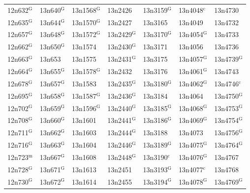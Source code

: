 \documentclass[12pt, oneside]{amsart}
\begin{document}
{\begin{longtable}{*{7}{>{\raggedright\arraybackslash}p{}}}
12n632$^{\mathrm{G}}$ & 13n640$^{\mathrm{G}}$ & 13n1568$^{\mathrm{G}}$ & 13n2426 & 13n3159$^{\mathrm{G}}$ & 13n4048$^{\mathrm{c}}$ & 13n4730 \\
12n635$^{\mathrm{G}}$ & 13n644$^{\mathrm{G}}$ & 13n1570$^{\mathrm{G}}$ & 13n2427 & 13n3165 & 13n4049 & 13n4732 \\
12n657$^{\mathrm{G}}$ & 13n648$^{\mathrm{G}}$ & 13n1572$^{\mathrm{G}}$ & 13n2429$^{\mathrm{G}}$ & 13n3170$^{\mathrm{G}}$ & 13n4054$^{\mathrm{G}}$ & 13n4733 \\
12n662$^{\mathrm{G}}$ & 13n650$^{\mathrm{G}}$ & 13n1574 & 13n2430$^{\mathrm{G}}$ & 13n3171 & 13n4056 & 13n4736 \\
12n663$^{\mathrm{G}}$ & 13n653 & 13n1575 & 13n2431$^{\mathrm{G}}$ & 13n3175 & 13n4057$^{\mathrm{G}}$ & 13n4739$^{\mathrm{G}}$ \\
12n664$^{\mathrm{G}}$ & 13n655$^{\mathrm{G}}$ & 13n1578$^{\mathrm{G}}$ & 13n2432 & 13n3176 & 13n4061$^{\mathrm{G}}$ & 13n4743 \\
12n678$^{\mathrm{G}}$ & 13n657$^{\mathrm{G}}$ & 13n1583 & 13n2435$^{\mathrm{G}}$ & 13n3180$^{\mathrm{G}}$ & 13n4062$^{\mathrm{G}}$ & 13n4746$^{\mathrm{c}}$ \\
12n695$^{\mathrm{G}}$ & 13n658$^{\mathrm{G}}$ & 13n1587$^{\mathrm{G}}$ & 13n2436$^{\mathrm{G}}$ & 13n3184 & 13n4064 & 13n4750$^{\mathrm{G}}$ \\
12n702$^{\mathrm{G}}$ & 13n659$^{\mathrm{G}}$ & 13n1596$^{\mathrm{G}}$ & 13n2440$^{\mathrm{G}}$ & 13n3185$^{\mathrm{G}}$ & 13n4068$^{\mathrm{G}}$ & 13n4753$^{\mathrm{G}}$ \\
12n708$^{\mathrm{G}}$ & 13n660$^{\mathrm{G}}$ & 13n1601 & 13n2441$^{\mathrm{G}}$ & 13n3186$^{\mathrm{G}}$ & 13n4069$^{\mathrm{G}}$ & 13n4754$^{\mathrm{G}}$ \\
12n711$^{\mathrm{G}}$ & 13n662$^{\mathrm{G}}$ & 13n1603 & 13n2444$^{\mathrm{G}}$ & 13n3188 & 13n4073 & 13n4756$^{\mathrm{G}}$ \\
12n716$^{\mathrm{G}}$ & 13n663$^{\mathrm{G}}$ & 13n1604 & 13n2446$^{\mathrm{G}}$ & 13n3189$^{\mathrm{G}}$ & 13n4075$^{\mathrm{G}}$ & 13n4764$^{\mathrm{G}}$ \\
12n723$^{\mathrm{m}}$ & 13n667$^{\mathrm{G}}$ & 13n1608 & 13n2448$^{\mathrm{G}}$ & 13n3190$^{\mathrm{c}}$ & 13n4076$^{\mathrm{G}}$ & 13n4767 \\
12n728$^{\mathrm{G}}$ & 13n671$^{\mathrm{G}}$ & 13n1613 & 13n2451 & 13n3193$^{\mathrm{G}}$ & 13n4077$^{\mathrm{c}}$ & 13n4768 \\
12n730$^{\mathrm{G}}$ & 13n672$^{\mathrm{G}}$ & 13n1614 & 13n2455 & 13n3194$^{\mathrm{G}}$ & 13n4078$^{\mathrm{G}}$ & 13n4769$^{\mathrm{G}}$ \\

\end{longtable}}
\end{document}

